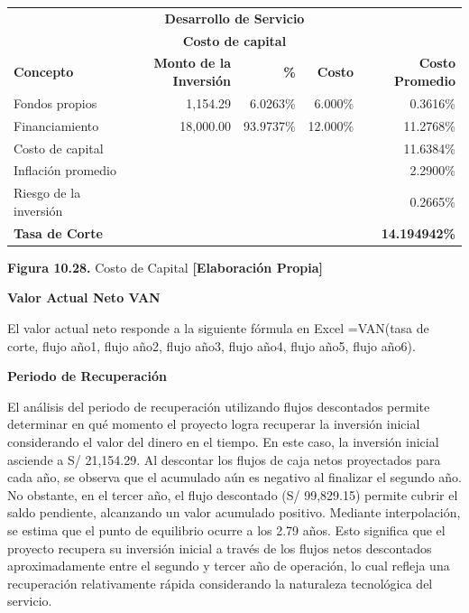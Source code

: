 \begin{table}[H]
\centering
\scriptsize
\renewcommand{\arraystretch}{1.15}
\setlength{\tabcolsep}{6pt}
\begin{tabular}{|l|r|r|r|r|}
\hline
\multicolumn{5}{|c|}{\textbf{Desarrollo de Servicio}} \\
\multicolumn{5}{|c|}{\textbf{Costo de capital}} \\ \hline

\textbf{Concepto} & \textbf{Monto de la Inversión} & \textbf{\%} & \textbf{Costo} & \textbf{Costo Promedio} \\ \hline

Fondos propios & 1,154.29 & 6.0263\% & 6.000\% & 0.3616\% \\ \hline
Financiamiento & 18,000.00 & 93.9737\% & 12.000\% & 11.2768\% \\ \hline
Costo de capital &  &  &  & 11.6384\% \\ \hline
Inflación promedio &  &  &  & 2.2900\% \\ \hline
Riesgo de la inversión &  &  &  & 0.2665\% \\ \hline
\textbf{Tasa de Corte} &  &  &  & \textbf{14.194942\%} \\ \hline

\end{tabular}

\vspace{0.2cm}
\textbf{Figura 10.28.} Costo de Capital \textbf{[Elaboración Propia]}
\end{table}

\textbf{Valor Actual Neto VAN}

El valor actual neto responde a la siguiente fórmula en Excel =VAN(tasa de corte, flujo año1, flujo año2, flujo año3, flujo año4, flujo año5, flujo año6).

\textbf{Periodo de Recuperación}

El análisis del periodo de recuperación utilizando flujos descontados permite determinar en qué momento el proyecto logra recuperar la inversión inicial considerando el valor del dinero en el tiempo. En este caso, la inversión inicial asciende a S/ 21,154.29. Al descontar los flujos de caja netos proyectados para cada año, se observa que el acumulado aún es negativo al finalizar el segundo año. No obstante, en el tercer año, el flujo descontado (S/ 99,829.15) permite cubrir el saldo pendiente, alcanzando un valor acumulado positivo. Mediante interpolación, se estima que el punto de equilibrio ocurre a los 2.79 años. Esto significa que el proyecto recupera su inversión inicial a través de los flujos netos descontados aproximadamente entre el segundo y tercer año de operación, lo cual refleja una recuperación relativamente rápida considerando la naturaleza tecnológica del servicio.